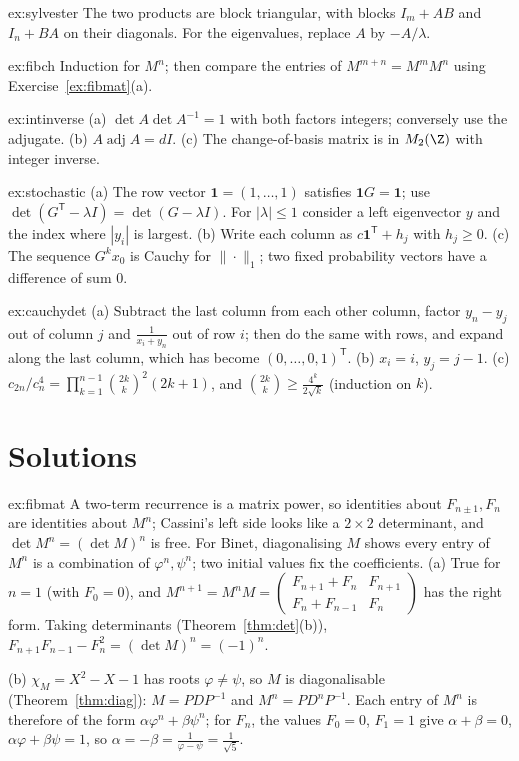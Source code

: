 \begin{hint}{ex:sylvester}
The two products are block triangular, with blocks $I_m+AB$ and $I_n+BA$ on their diagonals. For the eigenvalues, replace $A$ by $-A/\lambda$.
\end{hint}
\begin{hint}{ex:fibch}
Induction for $M^n$; then compare the entries of $M^{m+n}=M^mM^n$ using Exercise~\ref{ex:fibmat}(a).
\end{hint}
\begin{hint}{ex:intinverse}
(a) $\det A\det A^{-1}=1$ with both factors integers; conversely use the adjugate. (b) $A\operatorname{adj}A=dI$. (c) The change-of-basis matrix is in $M_2(\Z)$ with integer inverse.
\end{hint}
\begin{hint}{ex:stochastic}
(a) The row vector $\mathbf 1=(1,\dots,1)$ satisfies $\mathbf 1G=\mathbf 1$; use $\det(G^{\mathsf T}-\lambda I)=\det(G-\lambda I)$. For $|\lambda|\le1$ consider a left eigenvector $y$ and the index where $|y_i|$ is largest. (b) Write each column as $c\mathbf 1^{\mathsf T}+h_j$ with $h_j\ge0$. (c) The sequence $G^kx_0$ is Cauchy for $\|\cdot\|_1$; two fixed probability vectors have a difference of sum $0$.
\end{hint}
\begin{hint}{ex:cauchydet}
(a) Subtract the last column from each other column, factor $y_n-y_j$ out of column $j$ and $\frac1{x_i+y_n}$ out of row $i$; then do the same with rows, and expand along the last column, which has become $(0,\dots,0,1)^{\mathsf T}$. (b) $x_i=i$, $y_j=j-1$. (c) $c_{2n}/c_n^4=\prod_{k=1}^{n-1}\binom{2k}k^2(2k+1)$, and $\binom{2k}k\ge\frac{4^k}{2\sqrt k}$ (induction on $k$).
\end{hint}

\section{Solutions}

\begin{solution}{ex:fibmat}
\idea A two-term recurrence is a matrix power, so identities about $F_{n\pm1},F_n$ are identities about $M^n$; Cassini's left side looks like a $2\times2$ determinant, and $\det M^n=(\det M)^n$ is free. For Binet, diagonalising $M$ shows every entry of $M^n$ is a combination of $\varphi^n,\psi^n$; two initial values fix the coefficients.
\writeup (a) True for $n=1$ (with $F_0=0$), and $M^{n+1}=M^nM=\begin{pmatrix}F_{n+1}+F_n&F_{n+1}\\F_n+F_{n-1}&F_n\end{pmatrix}$ has the right form.
Taking determinants (Theorem~\ref{thm:det}(b)), $F_{n+1}F_{n-1}-F_n^2=(\det M)^n=(-1)^n$.

(b) $\chi_M=X^2-X-1$ has roots $\varphi\ne\psi$, so $M$ is diagonalisable (Theorem~\ref{thm:diag}): $M=PDP^{-1}$ and $M^n=PD^nP^{-1}$. Each entry of $M^n$ is therefore of the form
$\alpha\varphi^n+\beta\psi^n$; for $F_n$, the values $F_0=0$, $F_1=1$ give $\alpha+\beta=0$, $\alpha\varphi+\beta\psi=1$, so $\alpha=-\beta=\frac1{\varphi-\psi}=\frac1{\sqrt5}$.
\end{solution}

